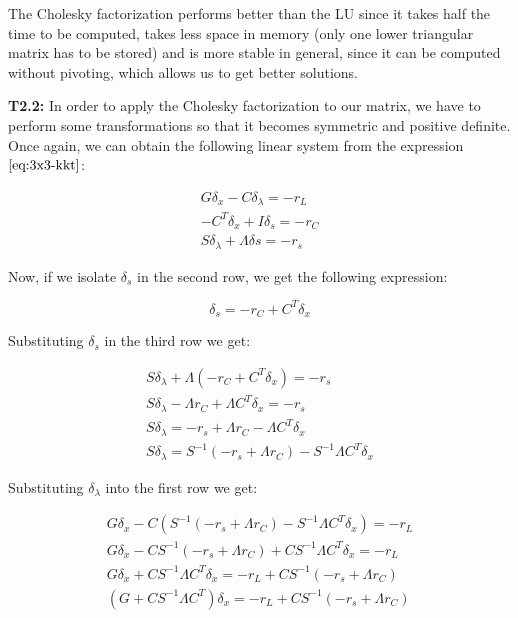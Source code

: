 \documentclass[11pt,a4paper]{article}
\begin{document}
The Cholesky factorization performs better than the LU since it takes half the time to
be computed, takes less space in memory (only one lower triangular matrix has to be stored)
and is more stable in general, since it can be computed without pivoting, which allows
us to get better solutions.

\noindent \textbf{T2.2:} In order to apply the Cholesky factorization to our matrix, we have to
perform some transformations so that it becomes symmetric and positive definite. Once again, we
can obtain the following linear system from the expression $\eqref{eq:3x3-kkt}$:

\begin{equation*}
  \begin{gathered}
    G\delta_x - C\delta_{\lambda} = -r_L \\
    -C^T\delta_x + I\delta_s = -r_C \\
    S\delta_{\lambda} + \Lambda \delta s = -r_s
  \end{gathered}
\end{equation*}

Now, if we isolate $\delta_s$ in the second row, we get the following expression:

\[
  \delta_s = -r_C + C^T \delta_x
\]

Substituting $\delta_s$ in the third row we get:

\begin{equation*}
  \begin{gathered}
    S\delta_{\lambda} + \Lambda(-r_C + C^T \delta_x) = -r_s \\
    S\delta_{\lambda} - \Lambda r_C + \Lambda C^T \delta_x = -r_s \\
    S\delta_{\lambda} = -r_s + \Lambda r_C - \Lambda C^T \delta_x \\
    S\delta_{\lambda} = S^{-1}(-r_s + \Lambda r_C) - S^{-1}\Lambda C^T \delta_x
  \end{gathered}
\end{equation*}

Substituting $\delta_{\lambda}$ into the first row we get:

\begin{equation*}
  \begin{gathered}
    G\delta_x - C(S^{-1}(-r_s + \Lambda r_C) - S^{-1}\Lambda C^T \delta_x) = -r_L \\
    G\delta_x - CS^{-1}(-r_s + \Lambda r_C) + CS^{-1}\Lambda C^T \delta_x = -r_L \\
    G\delta_x + CS^{-1}\Lambda C^T \delta_x = -r_L + CS^{-1}(-r_s + \Lambda r_C) \\
    (G + CS^{-1}\Lambda C^T) \delta_x = -r_L + CS^{-1}(-r_s + \Lambda r_C)
  \end{gathered}
\end{equation*}
\end{document}

